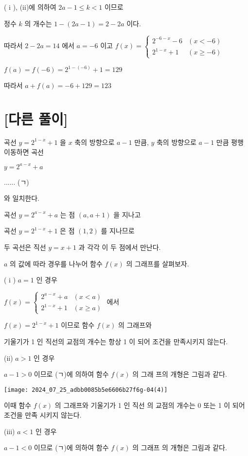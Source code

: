 \documentclass[10pt]{article}
\begin{document}
( i ), (ii)에 의하여 $2 a-1 \leq k<1$ 이므로

정수 $k$ 의 개수는 $1-(2 a-1)=2-2 a$ 이다.

따라서 $2-2 a=14$ 에서 $a=-6$ 이고 $f(x)= \begin{cases}2^{-6-x}-6 & (x<-6) \\ 2^{1-x}+1 & (x \geq-6)\end{cases}$

$f(a)=f(-6)=2^{1-(-6)}+1=129$

따라서 $a+f(a)=-6+129=123$

\section*{[다른 풀이]}
곡선 $y=2^{1-x}+1$ 을 $x$ 축의 방향으로 $a-1$ 만큼, $y$ 축의 방향으로 $a-1$ 만큼 평행이동하면 곡선

$y=2^{a-x}+a$

...... (ㄱ)

와 일치한다.

곡선 $y=2^{a-x}+a$ 는 점 $(a, a+1)$ 을 지나고

곡선 $y=2^{1-x}+1$ 은 점 $(1,2)$ 를 지나므로

두 곡선은 직선 $y=x+1$ 과 각각 이 두 점에서 만난다.

$a$ 의 값에 따라 경우를 나누어 함수 $f(x)$ 의 그래프를 살펴보자.

( i ) $a=1$ 인 경우

$f(x)=\left\{\begin{array}{ll}2^{a-x}+a & (x<a) \\ 2^{1-x}+1 & (x \geq a)\end{array}\right.$ 에서

$f(x)=2^{1-x}+1$ 이므로 함수 $f(x)$ 의 그래프와

기울기가 1 인 직선의 교점의 개수는 항상 1 이 되어 조건을 만족시키지 않는다.

(ii) $a>1$ 인 경우

$a-1>0$ 이므로 (ㄱ)에 의하여 함수 $f(x)$ 의 그래 프의 개형은 그림과 같다.

\begin{center}
\texttt{[image: 2024\_07\_25\_adbb0085b5e6606b27f6g-04(4)]}
\end{center}

이때 함수 $f(x)$ 의 그래프와 기울기가 1 인 직선 의 교점의 개수는 0 또는 1 이 되어 조건을 만족 시키지 않는다.

(iii) $a<1$ 인 경우

$a-1<0$ 이므로 (ㄱ)에 의하여 함수 $f(x)$ 의 그래프 의 개형은 그림과 같다.
\end{document}
